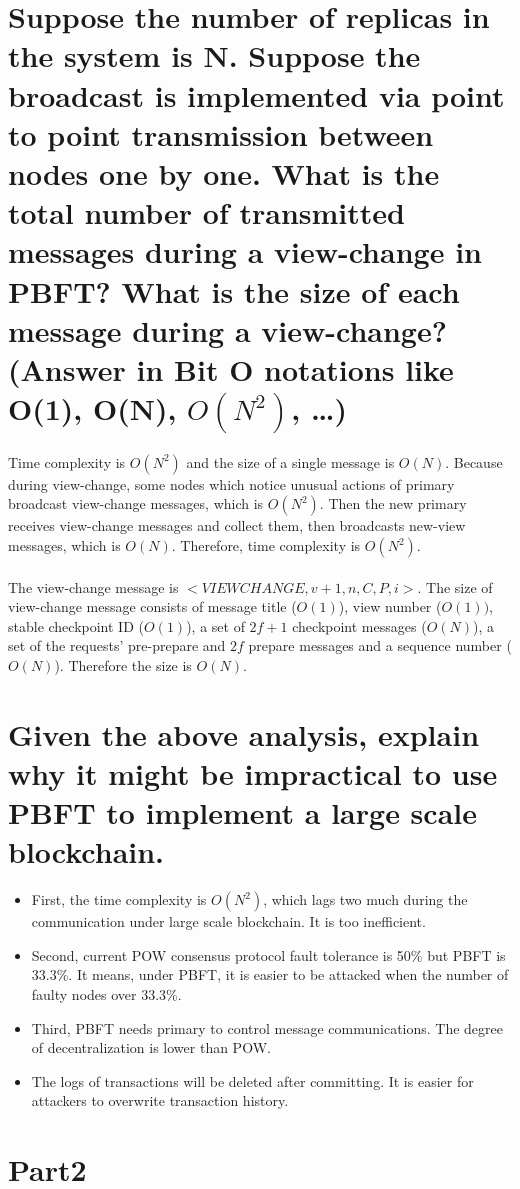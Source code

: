 \documentclass{article}
\begin{document}
\section{Suppose the number of replicas in the system is N. Suppose the broadcast is
implemented via point to point transmission between nodes one by one. What is
the total number of transmitted messages during a view-change in PBFT? What is
the size of each message during a view-change? (Answer in Bit O notations like
O(1), O(N), $O(N^2)$, …)}
Time complexity is $O(N^2)$ and the size of a single message is $O(N)$. 
Because during view-change, 
some nodes which notice unusual actions of primary broadcast view-change messages, 
which is $O(N^2)$. Then the new primary receives view-change messages and collect them, 
then broadcasts new-view messages, which is $O(N)$. 
Therefore, time complexity is $O(N^2)$.\\\\
The view-change message is $<VIEWCHANGE, v+1, n, C, P, i>$. 
The size of view-change message consists of message title ($O(1)$), 
view number ($O(1))$, 
stable checkpoint ID ($O(1)$),
a set of $2f+1$ checkpoint messages ($O(N)$), 
a set of the requests' pre-prepare and $2f$ prepare messages and a sequence number ($O(N)$).
Therefore the size is $O(N)$.
\section{Given the above analysis, explain why it might be impractical to use PBFT to
implement a large scale blockchain.}
\begin{itemize}
    \item First, the time complexity is $O(N^2)$, 
    which lags two much during the communication under large scale blockchain. It is too inefficient.
    \item Second, current POW consensus protocol fault tolerance is 50\% but PBFT is 33.3\%. 
    It means, under PBFT, it is easier to be attacked when the number of faulty nodes over 33.3\%.
    \item Third, PBFT needs primary to control message communications. The degree of decentralization is lower than POW.
    \item The logs of transactions will be deleted after committing. It is easier for attackers to overwrite transaction history.
\end{itemize}
\section*{Part2}
\end{document}

